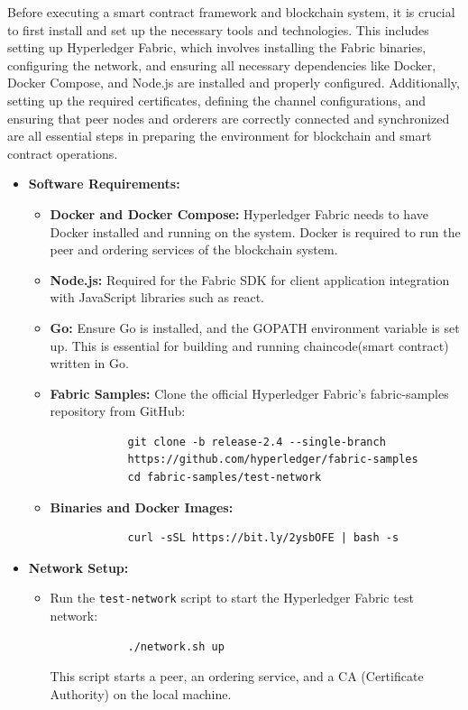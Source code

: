 Before executing a smart contract framework and blockchain system, it is crucial to first install and set up the necessary tools and technologies. This includes setting up Hyperledger Fabric, which involves installing the Fabric binaries, configuring the network, and ensuring all necessary dependencies like Docker, Docker Compose, and Node.js are installed and properly configured. Additionally, setting up the required certificates, defining the channel configurations, and ensuring that peer nodes and orderers are correctly connected and synchronized are all essential steps in preparing the environment for blockchain and smart contract operations.
\begin{itemize}
	
	\item \textbf{Software Requirements:}
	\begin{itemize}
		\item \textbf{Docker and Docker Compose:} Hyperledger Fabric needs to have Docker installed and running on the system. Docker is required to run the peer and ordering services of the blockchain system.
		\item \textbf{Node.js:} Required for the Fabric SDK for client application integration with JavaScript libraries such as react.
		\item \textbf{Go:} Ensure Go is installed, and the GOPATH environment variable is set up. This is essential for building and running chaincode(smart contract) written in Go.
		\item \textbf{Fabric Samples:} Clone the official Hyperledger Fabric's fabric-samples repository from GitHub:
		\begin{verbatim}
			git clone -b release-2.4 --single-branch 
			https://github.com/hyperledger/fabric-samples
			cd fabric-samples/test-network
		\end{verbatim}
		\item \textbf{Binaries and Docker Images:}
		\begin{verbatim}
			curl -sSL https://bit.ly/2ysbOFE | bash -s
		\end{verbatim}
		
		
	\end{itemize}
	
	
	\item \textbf{Network Setup:}
	\begin{itemize}
		\item Run the \texttt{test-network} script to start the Hyperledger Fabric test network:
		\begin{verbatim}
			./network.sh up
		\end{verbatim}
		This script starts a peer, an ordering service, and a CA (Certificate Authority) on the local machine.
		

\end{itemize}
\end{itemize}
